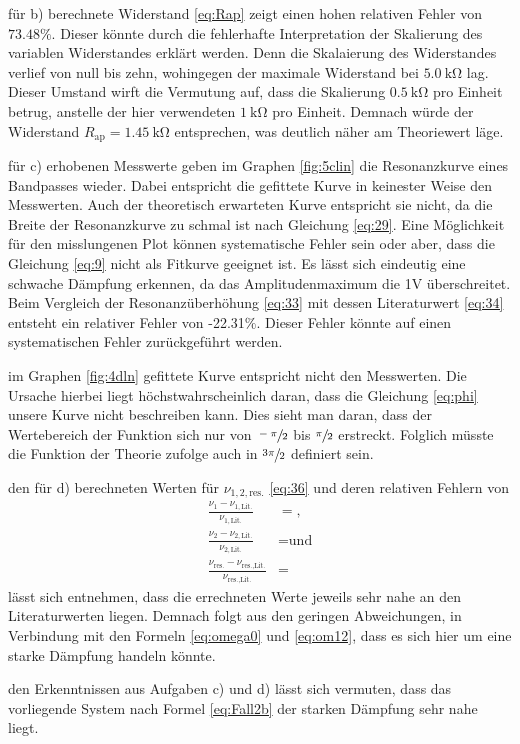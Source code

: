 \justifying für b) berechnete Widerstand \eqref{eq:Rap} zeigt einen hohen relativen Fehler von $73.48\%$. 
Dieser könnte durch die fehlerhafte Interpretation der Skalierung des variablen Widerstandes erklärt werden. Denn die Skalaierung 
des Widerstandes verlief von null bis zehn, wohingegen der maximale Widerstand bei $\SI{5.0}{\kilo\ohm} $ lag. Dieser Umstand wirft die 
Vermutung auf, dass die Skalierung $\SI{0.5}{\kilo\ohm}$ pro Einheit betrug, anstelle der hier verwendeten $\SI{1}{\kilo\ohm} $ pro Einheit. Demnach 
würde der Widerstand $R_{\text{ap}} = \SI{1.45}{\kilo\ohm}$ entsprechen, was deutlich näher am Theoriewert läge.

\justifying für c) erhobenen Messwerte geben im Graphen \ref{fig:5clin} die Resonanzkurve eines Bandpasses wieder.
Dabei entspricht die gefittete Kurve in keinester Weise den Messwerten. Auch der theoretisch erwarteten Kurve entspricht sie nicht, da die Breite der Resonanzkurve zu
schmal ist nach Gleichung \eqref{eq:29}. Eine Möglichkeit für den misslungenen Plot können
systematische Fehler sein oder aber, dass die Gleichung \eqref{eq:9} nicht als Fitkurve
geeignet ist.
Es lässt sich eindeutig eine schwache Dämpfung erkennen, da das Amplitudenmaximum die 1V überschreitet. Beim Vergleich der 
Resonanzüberhöhung \eqref{eq:33} mit dessen Literaturwert \eqref{eq:34} entsteht ein relativer Fehler von -22.31$\%$. Dieser Fehler könnte auf einen systematischen 
Fehler zurückgeführt werden.

 im Graphen \ref{fig:4dln} gefittete Kurve entspricht nicht den Messwerten.
Die Ursache hierbei liegt höchstwahrscheinlich daran, dass die Gleichung \eqref{eq:phi} unsere Kurve nicht
beschreiben kann. Dies sieht man daran, dass der Wertebereich der Funktion sich nur von $\sfrac{-\pi}{2} $ bis
$\sfrac{\pi}{2} $ erstreckt. Folglich müsste die Funktion der Theorie zufolge auch in $\sfrac{3\pi}{2} $ definiert sein.

\justifying den für d) berechneten Werten für $\nu_{1,2,\text{res.}}$ \eqref{eq:36} und deren relativen Fehlern von
  \begin{subequations}\label{eq:37}
  \begin{align}
    \frac{\nu_1 - \nu_{1,\text{Lit.}}}{\nu_{1,\text{Lit.}}} &= \text{}, \\
    \frac{\nu_2 - \nu_{2,\text{Lit.}}}{\nu_{2,\text{Lit.}}} &= \text{} \text{und} \\
    \frac{\nu_{\text{res.}} - \nu_{\text{res.,Lit.}}}{\nu_{\text{res.,Lit.}}} &= \text{}
  \end{align} 
  \end{subequations}
lässt sich entnehmen, dass die errechneten Werte jeweils sehr nahe an den Literaturwerten liegen. Demnach folgt aus den geringen Abweichungen, in 
Verbindung mit den Formeln \eqref{eq:omega0} und \eqref{eq:om12}, dass es sich hier um eine starke Dämpfung handeln könnte.

\justifying den Erkenntnissen aus Aufgaben c) und d) lässt sich vermuten, dass das vorliegende System nach Formel 
\eqref{eq:Fall2b} der starken Dämpfung sehr nahe liegt.  

\newpage

\printbibliography





